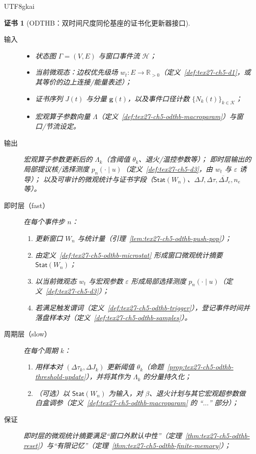 \documentclass[12pt]{article}
\newtheorem{Certificate}{证书}[section]
\newcommand{\RR}{\mathbb{R}}
\newcommand{\ORLDTHBase}{\textsf{ODTHB}}
\begin{document}
\begin{CJK*}{UTF8}{gkai}
\begin{Certificate}[\ORLDTHBase：双时间尺度同伦基座的证书化更新器接口]
\label{cert:tex27-ch5-odthb-interface}
\begin{description}
  \item[输入]
  \begin{itemize}
    \raggedright
    \item 状态图 $\Gamma=(V,E)$ 与窗口事件流 $\mathcal{H}$；
    \item 当前微观态：边权优先级场 $w_t:E\to\RR_{>0}$（定义~\ref{def:tex27-ch5-d1}，或其等价的边上连接/能量表述）；
    \item 证书序列 $J(t)$ 与分量 $\mathbf{g}(t)$，以及事件口径计数 $\{N_k(t)\}_{k\in\mathcal{K}}$；
    \item 宏观算子参数向量 $\Lambda$（定义~\ref{def:tex27-ch5-odthb-macroparam}）与窗口/节流设定。
  \end{itemize}
  \item[输出] 宏观算子参数更新后的 $\Lambda_k$（含阈值 $\theta_k$、退火/温控参数等）；
  即时层输出的局部提议核/选择测度 $p_n(\cdot\mid u)$（定义~\ref{def:tex27-ch5-d3}，由 $w_t$ 与 $\varepsilon$ 诱导）；
  以及可审计的微观统计与证书字段（$\mathsf{Stat}(W_n)$、$\Delta J,\Delta\tau,\overline{\Delta J}_e,n_e$ 等）。
  \item[即时层（fast）] 在每个事件步 $n$：
  \begin{enumerate}
    \item 更新窗口 $W_n$ 与统计量（引理~\ref{lem:tex27-ch5-odthb-push-pop}）；
    \item 由定义~\ref{def:tex27-ch5-odthb-microstat} 形成窗口微观统计摘要 $\mathsf{Stat}(W_n)$；
    \item 以当前微观态 $w_t$ 与宏观参数 $\varepsilon$ 形成局部选择测度 $p_n(\cdot\mid u)$（定义~\ref{def:tex27-ch5-d3}）；
    \item 若满足触发谓词（定义~\ref{def:tex27-ch5-odthb-trigger}），登记事件时间并落盘样本对（定义~\ref{def:tex27-ch5-odthb-samples}）。
  \end{enumerate}
  \item[周期层（slow）] 在每个周期 $k$：
  \begin{enumerate}
    \item 用样本对 $(\Delta\tau_k,\Delta J_k)$ 更新阈值 $\theta_k$（命题~\ref{prop:tex27-ch5-odthb-threshold-update}），并将其作为
      $\Lambda_k$ 的分量持久化；
    \item （可选）以 $\mathsf{Stat}(W_n)$ 为输入，对 $\beta$、退火计划与其它宏观超参数做白盒调参（定义~\ref{def:tex27-ch5-odthb-macroparam} 的
      ``$\ldots$'' 部分）；
  \end{enumerate}
  \item[保证] 即时层的微观统计摘要满足“窗口外默认中性”（定理~\ref{thm:tex27-ch5-odthb-reset}）与“有限记忆”（定理~\ref{thm:tex27-ch5-odthb-finite-memory}）；


\end{description}
\end{Certificate}
\end{CJK*}
\end{document}
